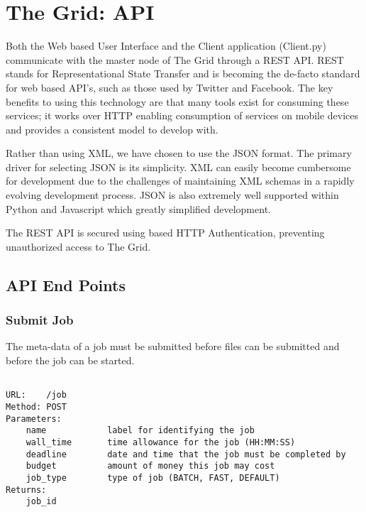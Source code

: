 \chapter{The Grid: API}
\label{thegrid:api}

Both the Web based User Interface and the Client application (Client.py) communicate with the master node of The Grid through a REST API. REST stands for Representational State Transfer and is becoming the de-facto standard for web based API's, such as those used by Twitter and Facebook. The key benefits to using this technology are that many tools exist for consuming these services; it works over HTTP enabling consumption of services on mobile devices and provides a consistent model to develop with.

Rather than using XML, we have chosen to use the JSON format. The primary driver for selecting JSON is its simplicity. XML can easily become cumbersome for development due to the challenges of maintaining XML schemas in a rapidly evolving development process. JSON is also extremely well supported within Python and Javascript which greatly simplified development.

The REST API is secured using based HTTP Authentication, preventing unauthorized access to The Grid.

\section{API End Points}
\label{apiendpoints}

\subsection{Submit Job}
\label{submitjob}

The meta-data of a job must be submitted before files can be submitted and before the job can be started.

\begin{adjustwidth}{2.5em}{2.5em}
\begin{verbatim}

URL:    /job
Method: POST
Parameters: 
    name            label for identifying the job
    wall_time       time allowance for the job (HH:MM:SS)
    deadline        date and time that the job must be completed by
    budget          amount of money this job may cost
    job_type        type of job (BATCH, FAST, DEFAULT)
Returns:    
    job_id

\end{verbatim}
\end{adjustwidth}

